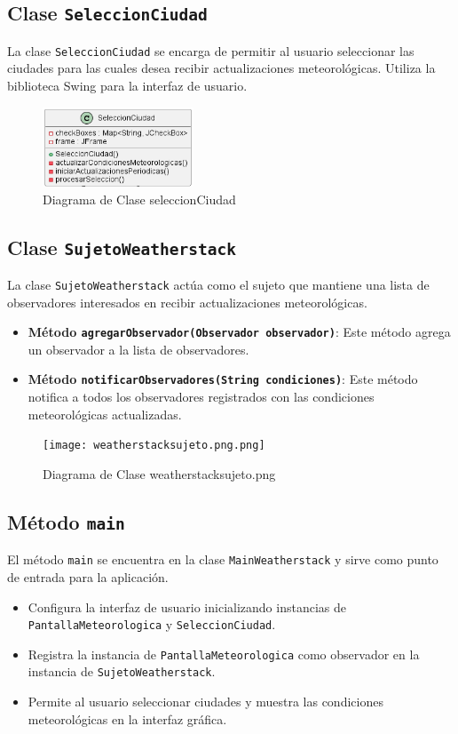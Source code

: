 \documentclass{article}
\begin{document}
\subsection{Clase \texttt{SeleccionCiudad}}
La clase \texttt{SeleccionCiudad} se encarga de permitir al usuario seleccionar las ciudades para las cuales desea recibir actualizaciones meteorológicas. Utiliza la biblioteca Swing para la interfaz de usuario.
\begin{figure}[H]
    \centering
    \includegraphics[width=0.4\textwidth]{seleccionCiudad.png}
    \caption{Diagrama de Clase seleccionCiudad}
    \label{figura:seleccionCiudad}
\end{figure}
\subsection{Clase \texttt{SujetoWeatherstack}}
La clase \texttt{SujetoWeatherstack} actúa como el sujeto que mantiene una lista de observadores interesados en recibir actualizaciones meteorológicas.

\begin{itemize}
    \item \textbf{Método \texttt{agregarObservador(Observador observador)}}: Este método agrega un observador a la lista de observadores.
    \item \textbf{Método \texttt{notificarObservadores(String condiciones)}}: Este método notifica a todos los observadores registrados con las condiciones meteorológicas actualizadas.
\end{itemize}

\begin{figure}[H]
    \centering
    \texttt{[image: weatherstacksujeto.png.png]}
    \caption{Diagrama de Clase weatherstacksujeto.png}
    \label{figura:weatherstacksujeto.png}
\end{figure}
\subsection{Método \texttt{main}}
El método \texttt{main} se encuentra en la clase \texttt{MainWeatherstack} y sirve como punto de entrada para la aplicación.

\begin{itemize}
    \item Configura la interfaz de usuario inicializando instancias de \texttt{PantallaMeteorologica} y \texttt{SeleccionCiudad}.
    \item Registra la instancia de \texttt{PantallaMeteorologica} como observador en la instancia de \texttt{SujetoWeatherstack}.
    \item Permite al usuario seleccionar ciudades y muestra las condiciones meteorológicas en la interfaz gráfica.
\end{itemize}
\end{document}
